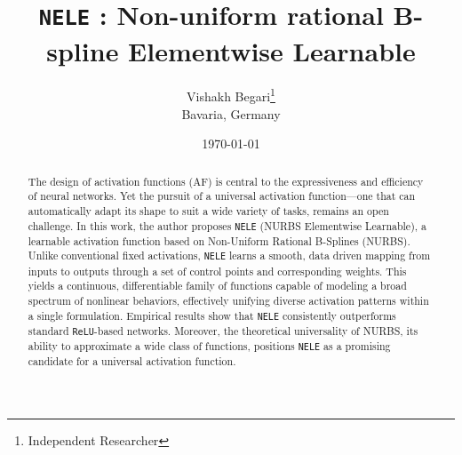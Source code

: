 \documentclass[11pt]{article}
\begin{document}
\title{\texttt{NELE} : Non-uniform rational B-spline Elementwise Learnable}
\author{Vishakh Begari\thanks{Independent Researcher}\\Bavaria, Germany}
\date{\today}
\maketitle

\begin{abstract}
The design of activation functions (AF) 
is central to the expressiveness and efficiency of neural networks. 
Yet the pursuit of a universal activation function—one that can 
automatically adapt its shape to suit a wide variety of tasks, remains 
an open challenge.
In this work, the author proposes \texttt{NELE} (NURBS Elementwise Learnable), 
a learnable activation function based on Non-Uniform Rational B-Splines (NURBS). 
Unlike conventional fixed activations, \texttt{NELE} 
learns a smooth, data driven mapping from inputs to outputs 
through a set of control points and corresponding weights. 
This yields a continuous, differentiable family of functions capable 
of modeling a broad spectrum of nonlinear behaviors, effectively 
unifying diverse activation patterns within a single formulation.
Empirical results show that \texttt{NELE} consistently 
outperforms standard \texttt{ReLU}-based networks. Moreover, 
the theoretical universality of NURBS, its ability to approximate a wide class 
of functions, positions \texttt{NELE} as a promising candidate 
for a universal activation function.
\end{abstract}
\end{document}
